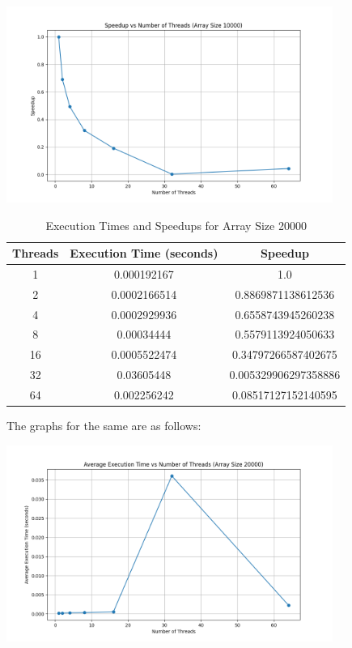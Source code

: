 \documentclass[12pt]{article}
\begin{document}
\begin{center}
    \includegraphics[width=0.8\textwidth]{speedup_vs_threads_10000.png}
    \label{fig:10000}
\end{center}

\begin{table}[h!]
    \centering
    \begin{tabular}{|c|c|c|}
    \hline
    \textbf{Threads} & \textbf{Execution Time (seconds)} & \textbf{Speedup} \\ \hline
    1  & 0.000192167  & 1.0 \\ \hline
    2  & 0.0002166514 & 0.8869871138612536 \\ \hline
    4  & 0.0002929936 & 0.6558743945260238 \\ \hline
    8  & 0.00034444   & 0.5579113924050633 \\ \hline
    16 & 0.0005522474 & 0.34797266587402675 \\ \hline
    32 & 0.03605448   & 0.005329906297358886 \\ \hline
    64 & 0.002256242  & 0.08517127152140595 \\ \hline
    \end{tabular}
    \caption{Execution Times and Speedups for Array Size 20000}
    \label{table:execution_times_speedups}
\end{table}
The graphs for the same are as follows:
\begin{center}
    \includegraphics[width=0.8\textwidth]{execution_time_vs_threads_20000.png}
    \label{fig:20000}
\end{center}
\end{document}
